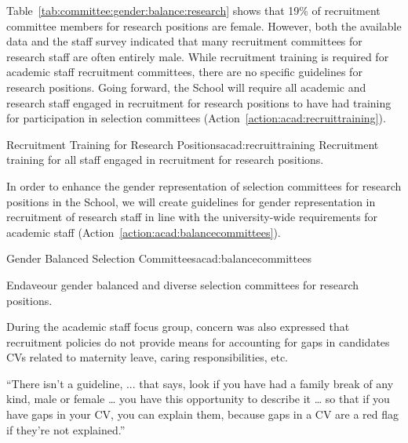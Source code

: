 

Table~\ref{tab:committee:gender:balance:research} shows that 19\% of recruitment committee members for research positions are female. However, both the available data and the staff survey indicated that many recruitment committees for research staff are often entirely male. 
While recruitment training is required for academic staff recruitment committees, there are no specific guidelines for research positions. Going forward, the School will require all academic and research staff engaged in recruitment for research positions to have had training for participation in selection committees (Action~\ref{action:acad:recruittraining}).


\newcommand{\actacadrecruittraining}{%
Recruitment training for all staff engaged in recruitment for research positions.
}
\begin{actionblock}{\ksspace{}Recruitment Training for Research Positions}{acad:recruittraining}
\actacadrecruittraining
\hfill{
    \hypersetup{hidelinks}
    \hyperlink{c7}{\gotoactionsymbol{}}
}
\end{actionblock}

In order to enhance the gender representation of selection committees for research positions in the School, we will create guidelines for gender representation in recruitment of research staff in line with the university-wide requirements for academic staff (Action~\ref{action:acad:balancecommittees}). %

\newcommand{\actacadbalancecommittees}{
Endaveour gender balanced and diverse selection committees for research positions.
}
\begin{actionblock}{\ksspace{}Gender Balanced Selection Committees}{acad:balancecommittees}
\actacadbalancecommittees
\hfill{
    \hypersetup{hidelinks}
    \hyperlink{c5}{\gotoactionsymbol{}}
}
\end{actionblock}



During the academic staff focus group, concern was also expressed that recruitment policies do not provide means for accounting for gaps in candidates CVs related to maternity leave, caring responsibilities, etc. 

\begin{myquote}
``There isn’t a guideline, ... that says, look if you have had a family break of any kind, male or female … you have this opportunity to describe it … so that if you have gaps in your CV, you can explain them, because gaps in a CV are a red flag if they're not explained.''
\end{myquote}

